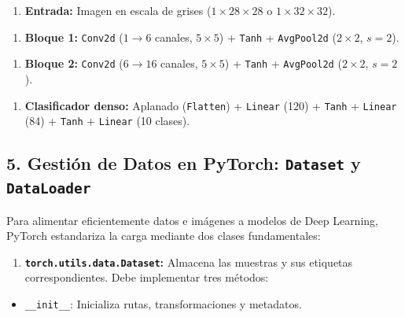 \documentclass[11pt,oneside]{article}
\begin{document}
\begin{enumerate}

\item \textbf{Entrada:} Imagen en escala de grises (\(1 \times 28 \times 28\) o \(1 \times 32 \times 32\)).

\end{enumerate}

\begin{enumerate}

\item \textbf{Bloque 1:} \texttt{Conv2d} (\(1 \rightarrow 6\) canales, \(5\times5\)) + \texttt{Tanh} + \texttt{AvgPool2d} (\(2\times2\), \(s=2\)).

\end{enumerate}

\begin{enumerate}

\item \textbf{Bloque 2:} \texttt{Conv2d} (\(6 \rightarrow 16\) canales, \(5\times5\)) + \texttt{Tanh} + \texttt{AvgPool2d} (\(2\times2\), \(s=2\)).

\end{enumerate}

\begin{enumerate}

\item \textbf{Clasificador denso:} Aplanado (\texttt{Flatten}) + \texttt{Linear} (120) + \texttt{Tanh} + \texttt{Linear} (84) + \texttt{Tanh} + \texttt{Linear} (10 clases).

\end{enumerate}

\subsection{5. Gestión de Datos en PyTorch: \texttt{Dataset} y \texttt{DataLoader}}

Para alimentar eficientemente datos e imágenes a modelos de Deep Learning, PyTorch estandariza la carga mediante dos clases fundamentales:

\begin{enumerate}

\item \textbf{\texttt{torch.utils.data.Dataset}:} Almacena las muestras y sus etiquetas correspondientes. Debe implementar tres métodos:

\end{enumerate}

\begin{itemize}

\item \texttt{\_\_init\_\_}: Inicializa rutas, transformaciones y metadatos.

\end{itemize}
\end{document}
